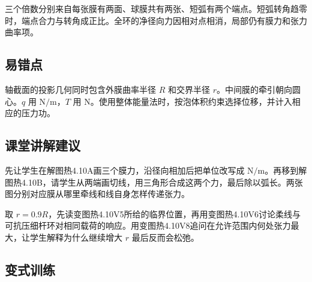 \documentclass[UTF8,fontset=fandol,a4paper,11pt]{ctexart}
\begin{document}
三个倍数分别来自每张膜有两面、球膜共有两张、短弧有两个端点。短弧转角趋零时，端点合力与转角成正比。全环的净径向力因相对点相消，局部仍有膜力和张力曲率项。



\subsection*{易错点}

轴截面的投影几何同时包含外膜曲率半径 $R$ 和交界半径 $r$。中间膜的牵引朝向圆心。$q$ 用 $\mathrm{N/m}$，$T$ 用 $\mathrm N$。使用整体能量法时，按泡体积约束选择位移，并计入相应的压力功。



\subsection*{课堂讲解建议}

先让学生在解图热4.10A画三个膜力，沿径向相加后把单位改写成 $\mathrm{N/m}$。再移到解图热4.10B，请学生从两端画切线，用三角形合成这两个力，最后除以弧长。两张图分别对应膜从哪里牵线和线自身怎样传递张力。

取 $r=0.9R$，先读变图热4.10V5所给的临界位置，再用变图热4.10V6讨论柔线与可抗压细杆环对相同载荷的响应。用变图热4.10V8追问在允许范围内何处张力最大，让学生解释为什么继续增大 $r$ 最后反而会松弛。



\subsection*{变式训练}
\end{document}
